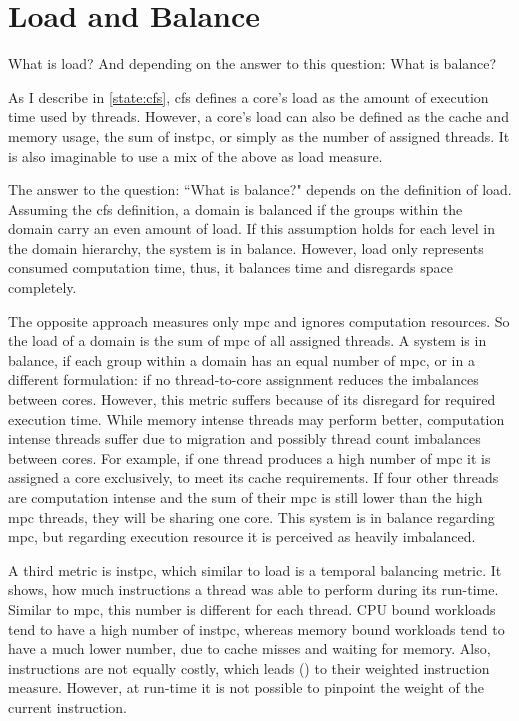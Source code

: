 \section{Load and Balance}
\label{design:load}


What is load?
And depending on the answer to this question: What is balance?

As I describe in \ref{state:cfs}, \gls{cfs} defines a core's load as the amount of
execution time used by threads.
However, a core's load can also be defined as
the cache and memory usage, the sum of \gls{instpc}, or simply as the number of
assigned threads.
It is also imaginable to use a mix of the above as load measure.

The answer to the question: ``What is balance?" depends on the definition of
load.
Assuming the \gls{cfs} definition, a domain is balanced if the groups within
the domain carry an even amount of load.
If this assumption holds for each level in the domain hierarchy, the system is
in balance.
However, load only represents consumed computation time, thus, it balances time
and disregards space completely.

The opposite approach measures only \gls{mpc} and ignores computation
resources.
So the load of a domain is the sum of \gls{mpc} of all assigned threads.
A system is in balance, if each group within a domain has an equal number of
\gls{mpc}, or in a different formulation:
if no thread-to-core assignment reduces the imbalances between cores.
However, this metric suffers because of its disregard for required execution time.
While memory intense threads may perform better, computation intense threads
suffer due to migration and possibly thread count imbalances between
cores.
For example, if one thread produces a high number of \gls{mpc} it is assigned a
core exclusively, to meet its cache requirements.
If four other threads are computation intense and the sum of their \gls{mpc} is
still lower than the high \gls{mpc} threads, they will be sharing one core.
This system is in balance regarding \gls{mpc}, but regarding execution resource
it is perceived as heavily imbalanced.

A third metric is \gls{instpc}, which similar to load is a temporal balancing
metric.
It shows, how much instructions a thread was able to perform during its
run-time.
Similar to \gls{mpc}, this number is different for each thread.
CPU bound workloads tend to have a high number of \gls{instpc},
whereas memory bound workloads tend to have a much lower number, due to cache
misses and waiting for memory.
Also, instructions are not equally costly, which leads
\citeauthor{snavely_symbiotic_2000} (\cite{snavely_symbiotic_2000}) to their
weighted instruction measure.
However, at run-time it is not possible to pinpoint the weight of the current
instruction.

